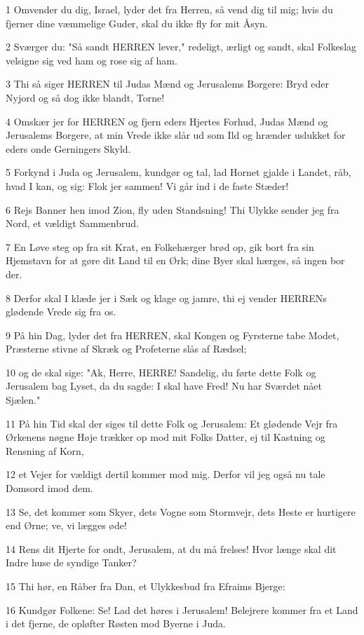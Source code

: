 \par 1 Omvender du dig, Israel, lyder det fra Herren, så vend dig til mig; hvis du fjerner dine væmmelige Guder, skal du ikke fly for mit Åsyn.
\par 2 Sværger du: "Så sandt HERREN lever," redeligt, ærligt og sandt, skal Folkeslag velsigne sig ved ham og rose sig af ham.
\par 3 Thi så siger HERREN til Judas Mænd og Jerusalems Borgere: Bryd eder Nyjord og så dog ikke blandt, Torne!
\par 4 Omskær jer for HERREN og fjern eders Hjertes Forhud, Judas Mænd og Jerusalems Borgere, at min Vrede ikke slår ud som Ild og hrænder uslukket for eders onde Gerningers Skyld.
\par 5 Forkynd i Juda og Jerusalem, kundgør og tal, lad Hornet gjalde i Landet, råb, hvad I kan, og sig: Flok jer sammen! Vi går ind i de faste Stæder!
\par 6 Rejs Banner hen imod Zion, fly uden Standsning! Thi Ulykke sender jeg fra Nord, et vældigt Sammenbrud.
\par 7 En Løve steg op fra sit Krat, en Folkehærger brød op, gik bort fra sin Hjemstavn for at gøre dit Land til en Ørk; dine Byer skal hærges, så ingen bor der.
\par 8 Derfor skal I klæde jer i Sæk og klage og jamre, thi ej vender HERRENs glødende Vrede sig fra os.
\par 9 På hin Dag, lyder det fra HERREN, skal Kongen og Fyrsterne tabe Modet, Præsterne stivne af Skræk og Profeterne slås af Rædsel;
\par 10 og de skal sige: "Ak, Herre, HERRE! Sandelig, du førte dette Folk og Jerusalem bag Lyset, da du sagde: I skal have Fred! Nu har Sværdet nået Sjælen."
\par 11 På hin Tid skal der siges til dette Folk og Jerusalem: Et glødende Vejr fra Ørkenens nøgne Høje trækker op mod mit Folks Datter, ej til Kastning og Rensning af Korn,
\par 12 et Vejer for vældigt dertil kommer mod mig. Derfor vil jeg også nu tale Domsord imod dem.
\par 13 Se, det kommer som Skyer, dets Vogne som Stormvejr, dets Heste er hurtigere end Ørne; ve, vi lægges øde!
\par 14 Rens dit Hjerte for ondt, Jerusalem, at du må frelses! Hvor længe skal dit Indre huse de syndige Tanker?
\par 15 Thi hør, en Råber fra Dan, et Ulykkesbud fra Efraims Bjerge:
\par 16 Kundgør Folkene: Se! Lad det høres i Jerusalem! Belejrere kommer fra et Land i det fjerne, de opløfter Røsten mod Byerne i Juda.
